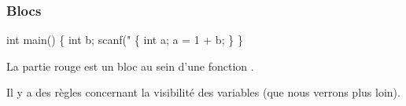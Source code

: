 \begin{frame}[fragile]\frametitle{Blocs}
\begin{multicols}{2}
\begin{semiverbatim}\footnotesize
int main() \{
    int b;
    scanf("%
    \textcolor{BrickRed}{\{
        int a;
        a = 1 + b;
    \}}
\}
\end{semiverbatim}

La partie rouge est un bloc au sein d'une fonction .
\bigskip

Il y a des règles concernant la visibilité des variables (que nous
verrons plus loin).
\bigskip
\bigskip
\bigskip
\bigskip
\end{multicols}
\bigskip

\begin{multicols}{2}
\begin{semiverbatim}\footnotesize{}
\end{semiverbatim}
\end{multicols}
\end{frame}

